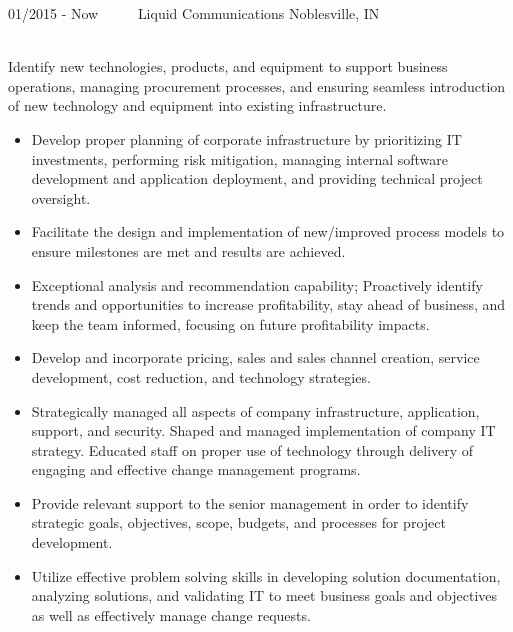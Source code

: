 \documentclass[]{cv-style}          %
\begin{document}
\begin{entrylist}
\entry
  {01/2015 - Now~~~~~}
  {Liquid Communications}
  {Noblesville, IN}
  {\\
  Identify new technologies, products, and equipment to support business operations, managing procurement processes, and ensuring seamless introduction of new technology and equipment into existing infrastructure.\\
\begin{itemize}
\item Develop proper planning of corporate infrastructure by prioritizing IT investments, performing risk mitigation, managing internal software development and application deployment, and providing technical project oversight.
\item Facilitate the design and implementation of new/improved process models to ensure milestones are met and results are achieved.
\item Exceptional analysis and recommendation capability; Proactively identify trends and opportunities to increase profitability, stay ahead of business, and keep the team informed, focusing on future profitability impacts.
\item Develop and incorporate pricing, sales and sales channel creation, service development, cost reduction, and technology strategies.
\item Strategically managed all aspects of company infrastructure, application, support, and security. Shaped and managed implementation of company IT strategy. Educated staff on proper use of technology through delivery of engaging and effective change management programs.
\item Provide relevant support to the senior management in order to identify strategic goals, objectives, scope, budgets, and processes for project development.
\item Utilize effective problem solving skills in developing solution documentation, analyzing solutions, and validating IT to meet business goals and objectives as well as effectively manage change requests.


\end{itemize}}
\end{entrylist}
\end{document}
